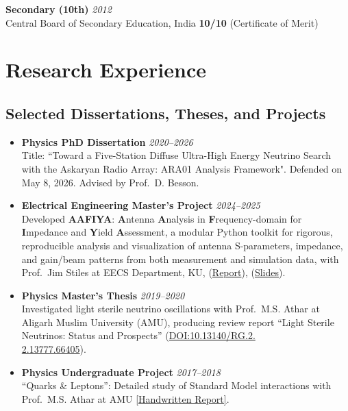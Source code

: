 \documentclass[10pt]{report}
\begin{document}
\vspace{0em}
\noindent
\textbf{Secondary (10th)} \textit{2012} \\
Central Board of Secondary Education, India \hfill \textbf{10/10} (Certificate of Merit)

\section*{Research Experience}

\subsection*{Selected Dissertations, Theses, and Projects}
\begin{itemize}
    \item \textbf{Physics PhD Dissertation}  \textit{2020--2026} \\
    Title: ``Toward a Five-Station Diffuse Ultra-High Energy Neutrino Search with the Askaryan Radio Array: ARA01 Analysis Framework". Defended on May 8, 2026. Advised by Prof.\ D. Besson. 
    
    \item \textbf{Electrical Engineering Master's Project}  \textit{2024--2025} \\
     Developed \textbf{AAFIYA}: \textbf{A}ntenna \textbf{A}nalysis in \textbf{F}requency-domain for \textbf{I}mpedance and \textbf{Y}ield \textbf{A}ssessment, a modular Python toolkit for rigorous, reproducible analysis and visualization of antenna S-parameters, impedance, and gain/beam patterns from both measurement and simulation data, with Prof.\ Jim Stiles at EECS Department, KU, (\href{https://drive.google.com/file/d/16pZq9mp9qqmyMbJ__h_DtHzoyZJUpfUi/view?usp=share_link}{Report}), (\href{https://drive.google.com/file/d/1gTU03rgjUmX7zF2z2f57pjpDCmZjiHhI/view?usp=share_link}{Slides}).

     \item \textbf{Physics Master's Thesis}  \textit{2019--2020} \\
     Investigated light sterile neutrino oscillations with Prof.\ M.S. Athar at Aligarh Muslim University (AMU), producing review report ``Light Sterile Neutrinos: Status and Prospects'' (\href{https://www.researchgate.net/publication/354254795_LIGHT_STERILE_NEUTRINOS_OSCILLATION_STATUS_AND_PROSPECTS}{DOI:10.13140/RG.2.\\2.13777.66405}).

     \item \textbf{Physics Undergraduate Project}  \textit{2017--2018} \\
     ``Quarks \& Leptons'': Detailed study of Standard Model interactions with Prof.\ M.S. Athar at AMU \href{https://drive.google.com/file/d/11LsyY1QmncnjOGf1ZWpj7eTM-xcTbCNj/view?usp=sharing}{[Handwritten Report]}.

\end{itemize} 
\end{document}
